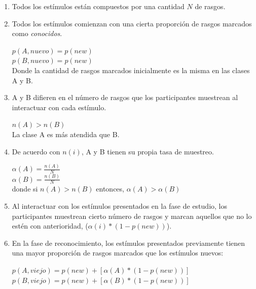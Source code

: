 \begin{enumerate}
\item Todos los estímulos están compuestos por una cantidad $N$ de rasgos.\\

\item Todos los estímulos comienzan con una cierta proporción de rasgos marcados como \textit{conocidos}.\\
\begin{center}
$p(A,nuevo) = p(new)$\\
$p(B,nuevo) = p(new)$\\
Donde la cantidad de rasgos marcados inicialmente es la misma en las clases A y B.\\
\end{center}

\item A y B difieren en el número de rasgos que los participantes muestrean al interactuar con cada estímulo.\\
\begin{center}
$n(A) > n(B)$\\
La clase A es más atendida que B.\\
\end{center}

\item De acuerdo con $n(i)$, A y B tienen su propia tasa de muestreo.\\
\begin{center}
$\alpha(A) = \frac{n(A)}{N}$\\
$\alpha(B) = \frac{n(B)}{N}$\\
donde si $n(A) > n(B)$ entonces, $\alpha(A) > \alpha(B)$\
\end{center}

\item Al interactuar con los estímulos presentados en la fase de estudio, los participantes muestrean cierto número de rasgos y marcan aquellos que no lo estén con anterioridad, ($\alpha(i)*(1-p(new))$).\\

\item En la fase de reconocimiento, los estímulos presentados previamente tienen una mayor proporción de rasgos marcados que los estímulos nuevos:\\
\begin{center}
$p(A,viejo) = p(new) + [\alpha(A)*(1-p(new))]$\\
$p(B,viejo) = p (new) + [\alpha(B)*(1-p(new))]$\\
\end{center}
\end{enumerate}

